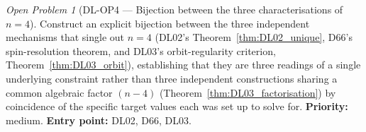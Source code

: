 \documentclass[11pt,a4paper]{article}
\theoremstyle{plain}
\theoremstyle{definition}
\theoremstyle{remark}
\newtheorem{openproblem}[theorem]{Open Problem}
\begin{document}
\begin{openproblem}[DL-OP4 --- Bijection between the three characterisations of $n=4$]
\label{op:DL_bijection}
Construct an explicit bijection between the three independent mechanisms that single out $n=4$ (DL02's Theorem~\ref{thm:DL02_unique}, D66's spin-resolution theorem, and DL03's orbit-regularity criterion, Theorem~\ref{thm:DL03_orbit}), establishing that they are three readings of a single underlying constraint rather than three independent constructions sharing a common algebraic factor $(n-4)$ (Theorem~\ref{thm:DL03_factorisation}) by coincidence of the specific target values each was set up to solve for. \textbf{Priority:} medium. \textbf{Entry point:} DL02, D66, DL03.
\end{openproblem}

\clearpage



\end{document}
